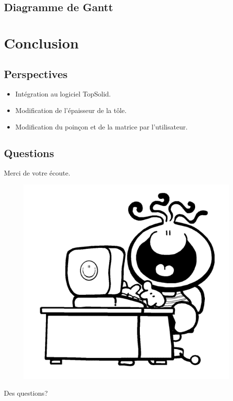 \documentclass{beamer}
\begin{document}
\subsection{Diagramme de Gantt}

\section{Conclusion}
\subsection{Perspectives}
\begin{frame}
    \begin{itemize}
        \item Intégration au logiciel TopSolid.
        \item Modification de l'épaisseur de la tôle.
        \item Modification du poinçon et de la matrice par l'utilisateur.
    \end{itemize}
\end{frame}
\subsection{Questions}
\begin{frame}
    Merci de votre écoute.
    \begin{figure}
        \includegraphics[width=.55\textwidth]{img/conclusion.png}
        \label{Conclusion}
    \end{figure}
    \hfill Des questions?
\end{frame}
\end{document}
